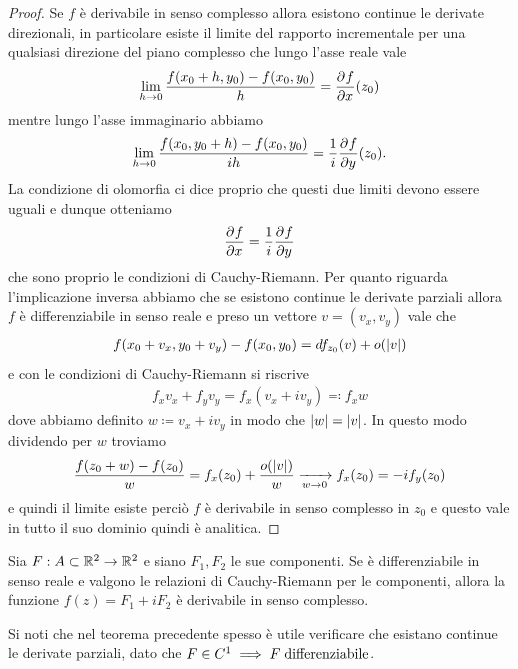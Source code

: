 \begin{proof}
  Se $ f  $ è derivabile in senso complesso allora esistono continue le derivate direzionali, in particolare esiste il limite 
  del rapporto incrementale per una qualsiasi direzione del piano complesso che 
  lungo l'asse reale vale
  \begin{align}
    \lim_{h\to 0} \frac{f(x_0 + h, y_0) - f(x_0, y_0)}{h} = \frac{\partial^{} {f}}{\partial {x}^{}}(z_0)
  \end{align}
  mentre lungo l'asse immaginario abbiamo
  \begin{align}
    \lim_{h\to0} \frac{f(x_0, y_0 + h) - f(x_0, y_0)}{i h} = \frac1i \frac{\partial^{} {f}}{\partial {y}^{}}(z_0).
  \end{align}
  La condizione di olomorfia ci dice proprio che questi due limiti devono essere uguali e dunque otteniamo 
  \begin{align}
    \frac{\partial^{} {f}}{\partial {x}^{}} = \frac1i \frac{\partial^{} {f}}{\partial {y}^{}}
  \end{align}
  che sono proprio le condizioni di Cauchy-Riemann. Per quanto riguarda l'implicazione inversa abbiamo che se esistono continue 
  le derivate parziali allora $ f $ è differenziabile in senso reale e preso un vettore $ v = (v_x, v_y) $ vale che
  \begin{align}
    f(x_0 + v_x, y_0 + v_y) - f(x_0, y_0) = df_{z_0}(v) + o(\left|{v}\right|)
  \end{align}
  e con le condizioni di Cauchy-Riemann si riscrive 
  \begin{align}
    f_x v_x + f_y v_y = f_x(v_x + i v_y) \eqcolon f_x w
  \end{align}
  dove abbiamo definito $ w \coloneq v_x + i v_y $ in modo che $ \left|{w}\right| = \left|{v}\right| $. In questo modo dividendo per $ w $ troviamo 
  \begin{align}
    \frac{f(z_0 + w) - f(z_0)}{w} = f_x(z_0) + \frac{o(\left|{v}\right|)}{w} \xrightarrow[w \to 0]{} f_x(z_0) = -i f_y(z_0)
  \end{align}
  e quindi il limite esiste perciò $ f $ è derivabile in senso complesso in $ z_0 $ e questo vale in tutto il suo dominio quindi è analitica.
\end{proof}

\begin{corollary}
  Sia $ F: A \subset \mathbb{R}^2 \to \mathbb{R}^2 $ e siano $ F_1, F_2 $ le sue componenti. Se è differenziabile in senso reale e valgono le relazioni di Cauchy-Riemann 
  per le componenti, allora la funzione $ f(z) = F_1 + i F_2 $ è derivabile in senso complesso.
\end{corollary}
Si noti che nel teorema precedente spesso è utile verificare che esistano continue le derivate parziali, dato che 
$ F \in C^1 \implies F \; \textnormal{differenziabile} $.

